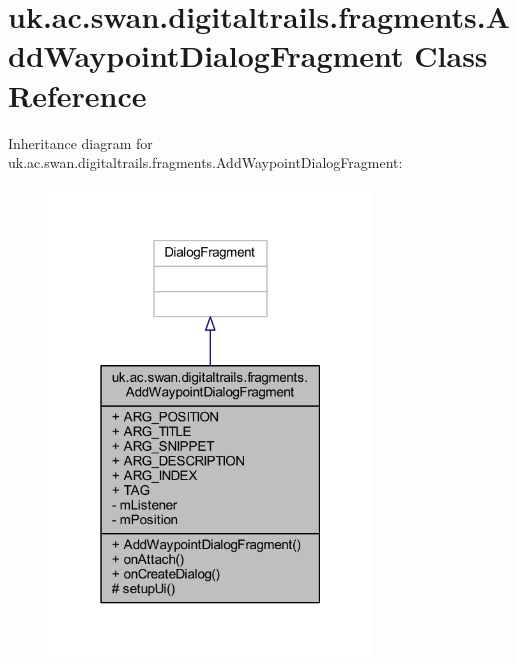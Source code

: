 \hypertarget{classuk_1_1ac_1_1swan_1_1digitaltrails_1_1fragments_1_1_add_waypoint_dialog_fragment}{\section{uk.\+ac.\+swan.\+digitaltrails.\+fragments.\+Add\+Waypoint\+Dialog\+Fragment Class Reference}
\label{classuk_1_1ac_1_1swan_1_1digitaltrails_1_1fragments_1_1_add_waypoint_dialog_fragment}
}


Inheritance diagram for uk.\+ac.\+swan.\+digitaltrails.\+fragments.\+Add\+Waypoint\+Dialog\+Fragment\+:
\nopagebreak
\begin{figure}[H]
\begin{center}
\leavevmode
\includegraphics[width=244pt]{classuk_1_1ac_1_1swan_1_1digitaltrails_1_1fragments_1_1_add_waypoint_dialog_fragment__inherit__graph}
\end{center}
\end{figure}


